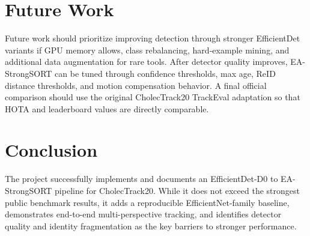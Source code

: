\documentclass[12pt,a4paper]{report}
\begin{document}
\section{Future Work}
Future work should prioritize improving detection through stronger EfficientDet variants if GPU memory allows, class rebalancing, hard-example mining, and additional data augmentation for rare tools. After detector quality improves, EA-StrongSORT can be tuned through confidence thresholds, max age, ReID distance thresholds, and motion compensation behavior. A final official comparison should use the original CholecTrack20 TrackEval adaptation so that HOTA and leaderboard values are directly comparable.
\section{Conclusion}
The project successfully implements and documents an EfficientDet-D0 to EA-StrongSORT pipeline for CholecTrack20. While it does not exceed the strongest public benchmark results, it adds a reproducible EfficientNet-family baseline, demonstrates end-to-end multi-perspective tracking, and identifies detector quality and identity fragmentation as the key barriers to stronger performance.
        \clearpage
        
        
        
\end{document}
